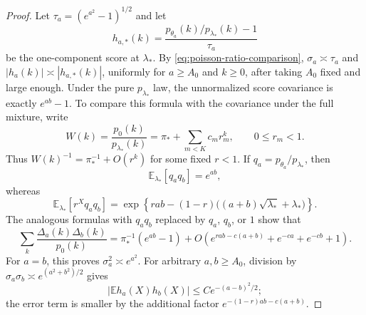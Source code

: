 \documentclass[11pt]{article}
\theoremstyle{definition}
\numberwithin{equation}{section}
\newcommand{\E}{\mathbb{E}}
\begin{document}
\begin{proof}
Let \(\tau_a=(e^{a^2}-1)^{1/2}\) and let
\[
    h_{a,*}(k)=
    \frac{p_{\theta_a}(k)/p_{\lambda_*}(k)-1}{\tau_a}
\]
be the one-component score at \(\lambda_*\). By
\eqref{eq:poisson-ratio-comparison}, \(\sigma_a\asymp\tau_a\) and
\(|h_a(k)|\asymp |h_{a,*}(k)|\), uniformly for \(a\ge A_0\) and
\(k\ge0\), after taking \(A_0\) fixed and large enough. Under the pure
\(p_{\lambda_*}\) law, the unnormalized score covariance is exactly
\(e^{ab}-1\). To compare this formula with the covariance under the full
mixture, write
\[
    W(k)=\frac{p_0(k)}{p_{\lambda_*}(k)}
    =\pi_*+\sum_{m<K}c_m r_m^k,
    \qquad 0\le r_m<1.
\]
Thus \(W(k)^{-1}=\pi_*^{-1}+O(r^k)\) for some fixed \(r<1\). If
\(q_a=p_{\theta_a}/p_{\lambda_*}\), then
\[
    \E_{\lambda_*}[q_aq_b]=e^{ab},
\]
whereas
\[
    \E_{\lambda_*}[r^Xq_aq_b]
    =
    \exp\!\left\{
        rab-(1-r)\bigl((a+b)\sqrt{\lambda_*}+\lambda_*\bigr)
    \right\}.
\]
The analogous formulas with \(q_aq_b\) replaced by \(q_a\), \(q_b\), or
\(1\) show that
\[
    \sum_k\frac{\Delta_a(k)\Delta_b(k)}{p_0(k)}
    =
    \pi_*^{-1}(e^{ab}-1)
    +O\!\left(
        e^{rab-c(a+b)}+e^{-ca}+e^{-cb}+1
    \right).
\]
For \(a=b\), this proves \(\sigma_a^2\asymp e^{a^2}\). For arbitrary
\(a,b\ge A_0\), division by
\(\sigma_a\sigma_b\asymp e^{(a^2+b^2)/2}\) gives
\[
    |\E h_a(X)h_b(X)|
    \le C e^{-(a-b)^2/2};
\]
the error term is smaller by the additional factor
\(e^{-(1-r)ab-c(a+b)}\).


\end{proof}
\end{document}
